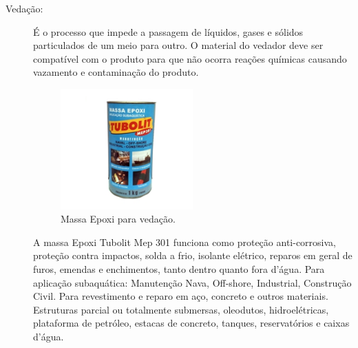 \begin{description}
\item[Vedação:] É o processo que impede a passagem de líquidos, gases e
sólidos particulados de um meio para outro. O material do vedador deve ser
compatível com o produto para que não ocorra reações químicas causando vazamento
e contaminação do produto.
\par
\begin{figure}[h]
  \centering
  \includegraphics[width=0.5\textwidth]{figures/haha.png}
  \caption{Massa Epoxi para vedação.}
  \label{fig:haha}
\end{figure}
\FloatBarrier
\par
A massa Epoxi Tubolit Mep 301 funciona como proteção anti-corrosiva, proteção
contra impactos, solda a frio, isolante elétrico, reparos em geral de furos,
emendas e enchimentos, tanto dentro quanto fora d’água. Para aplicação
subaquática: Manutenção Nava, Off-shore, Industrial, Construção Civil. Para
revestimento e reparo em aço, concreto e outros materiais. Estruturas parcial
ou totalmente submersas, oleodutos, hidroelétricas, plataforma de petróleo,
estacas de concreto, tanques, reservatórios e caixas d'água.
\end{description}


